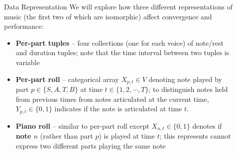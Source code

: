 \documentclass[final]{beamer}
\newlength{\sepwid}
\newlength{\onecolwid}
\newlength{\twocolwid}
\begin{document}
\begin{frame}[t]
\begin{columns}[t]
\begin{column}{\onecolwid}

\begin{block}{Data Representation}
  We will explore how three different representations of music (the first two of
  which are isomorphic) affect convergence and performance:
  \begin{itemize}
    \item \textbf{Per-part tuples} -- four collections (one for each voice) of
      note/rest and duration tuples; note that the time interval between two
      tuples is variable
    \item \textbf{Per-part roll} -- categorical array $X_{p,t} \in V$
      denoting note played by part $p \in \{S,A,T,B\}$ at time $t \in \{1,2,\cdots,T\}$;
      to distinguish notes held from previous times from notes articulated at the current
      time, $Y_{p,t} \in \{0,1\}$ indicates if the note is articulated at time $t$.
    \item \textbf{Piano roll} -- similar to per-part roll except $X_{n,t} \in
      \{0,1\}$ denotes if \textbf{note $n$} (rather than part $p$) is played at
      time $t$; this represents cannot express two different parts playing the
      same note
  \end{itemize}

\end{block}


\end{column} %

\begin{column}{\sepwid}\end{column} %

\begin{column}{\twocolwid} %

\begin{columns}[t,totalwidth=\twocolwid] %

\begin{column}{\onecolwid}\vspace{-.6in} %



\end{column}
\end{columns}
\end{column}
\end{columns}
\end{frame}
\end{document}
